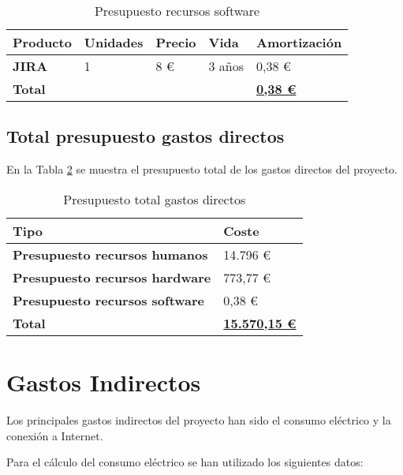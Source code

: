 \begin{table}[H]\label{tab:preprecsw}
	\centering
	\begin{tabular}{|l|l|l|l|l|}
		\hline
		\textbf{Producto} & \textbf{Unidades} & \textbf{Precio} & \textbf{Vida} & \textbf{Amortización} \\ \hline
		\textbf{JIRA}     & 1                 & 8 € \cite{Tfg:jiraprice} & 3 años        & 0,38 €                \\ \hline
		\multicolumn{4}{|l|}{\textbf{Total}} & \textbf{\underline{0,38 €}}                               \\ \hline
	\end{tabular}
	\caption{Presupuesto recursos software}
\end{table}

\subsection{Total presupuesto gastos directos}
En la Tabla \ref{tab:preptotal} se muestra el presupuesto total de los gastos directos del proyecto.

\begin{table}[H]\label{tab:preptotal}
	\centering
	\begin{tabular}{|l|l|}
		\hline
		\textbf{Tipo}                          & \textbf{Coste}                   \\ \hline
		\textbf{Presupuesto recursos humanos}  & 14.796 €                         \\ \hline
		\textbf{Presupuesto recursos hardware} & 773,77 €                         \\ \hline
		\textbf{Presupuesto recursos software} &0,38 €                            \\ \hline
		\textbf{Total}                         & \textbf{\underline{15.570,15 €}} \\ \hline
	\end{tabular}
	\caption{Presupuesto total gastos directos}
\end{table}

\section{Gastos Indirectos}

Los principales gastos indirectos del proyecto han sido el consumo eléctrico y la conexión a Internet. 

Para el cálculo del consumo eléctrico se han utilizado los siguientes datos:

